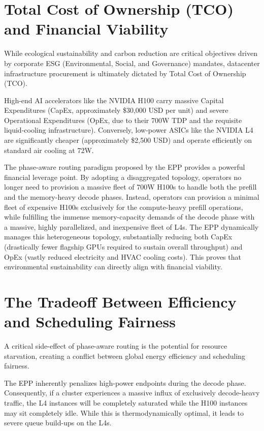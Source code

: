 \documentclass[12pt,a4paper,oneside]{report}
\begin{document}
\section{Total Cost of Ownership (TCO) and Financial Viability}
\label{sec:disc_tco}

While ecological sustainability and carbon reduction are critical objectives driven by corporate ESG (Environmental, Social, and Governance) mandates, datacenter infrastructure procurement is ultimately dictated by Total Cost of Ownership (TCO). 

High-end AI accelerators like the NVIDIA H100 carry massive Capital Expenditures (CapEx, approximately \$30,000 USD per unit) and severe Operational Expenditures (OpEx, due to their 700W TDP and the requisite liquid-cooling infrastructure). Conversely, low-power ASICs like the NVIDIA L4 are significantly cheaper (approximately \$2,500 USD) and operate efficiently on standard air cooling at 72W. 

The phase-aware routing paradigm proposed by the EPP provides a powerful financial leverage point. By adopting a disaggregated topology, operators no longer need to provision a massive fleet of 700W H100s to handle both the prefill and the memory-heavy decode phases. Instead, operators can provision a minimal fleet of expensive H100s exclusively for the compute-heavy prefill operations, while fulfilling the immense memory-capacity demands of the decode phase with a massive, highly parallelized, and inexpensive fleet of L4s. The EPP dynamically manages this heterogeneous topology, substantially reducing both CapEx (drastically fewer flagship GPUs required to sustain overall throughput) and OpEx (vastly reduced electricity and HVAC cooling costs). This proves that environmental sustainability can directly align with financial viability.

\section{The Tradeoff Between Efficiency and Scheduling Fairness}
\label{sec:disc_fairness}

A critical side-effect of phase-aware routing is the potential for resource starvation, creating a conflict between global energy efficiency and scheduling fairness. 

The EPP inherently penalizes high-power endpoints during the decode phase. Consequently, if a cluster experiences a massive influx of exclusively decode-heavy traffic, the L4 instances will be completely saturated while the H100 instances may sit completely idle. While this is thermodynamically optimal, it leads to severe queue build-ups on the L4s. 
\end{document}
